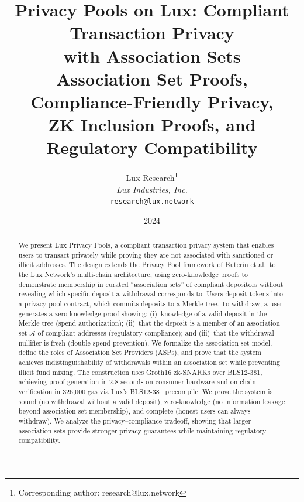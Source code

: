 \documentclass[11pt,a4paper]{article}
\title{\textbf{Privacy Pools on Lux: Compliant Transaction Privacy\\with Association Sets}\\[6pt]
\large Association Set Proofs, Compliance-Friendly Privacy,\\ZK Inclusion Proofs, and Regulatory Compatibility}
\author{
Lux Research\thanks{Corresponding author: research@lux.network}\\
\textit{Lux Industries, Inc.}\\
\texttt{research@lux.network}
}
\date{2024}
\begin{document}
\luxcoverpage

\begin{abstract}
We present Lux Privacy Pools, a compliant transaction privacy system that enables users to transact privately while proving they are not associated with sanctioned or illicit addresses. The design extends the Privacy Pool framework of Buterin et al.\ to the Lux Network's multi-chain architecture, using zero-knowledge proofs to demonstrate membership in curated ``association sets'' of compliant depositors without revealing which specific deposit a withdrawal corresponds to. Users deposit tokens into a privacy pool contract, which commits deposits to a Merkle tree. To withdraw, a user generates a zero-knowledge proof showing: (i)~knowledge of a valid deposit in the Merkle tree (spend authorization); (ii)~that the deposit is a member of an association set $\mathcal{A}$ of compliant addresses (regulatory compliance); and (iii)~that the withdrawal nullifier is fresh (double-spend prevention). We formalize the association set model, define the roles of Association Set Providers (ASPs), and prove that the system achieves indistinguishability of withdrawals within an association set while preventing illicit fund mixing. The construction uses Groth16 zk-SNARKs over BLS12-381, achieving proof generation in 2.8 seconds on consumer hardware and on-chain verification in 326,000 gas via Lux's BLS12-381 precompile. We prove the system is sound (no withdrawal without a valid deposit), zero-knowledge (no information leakage beyond association set membership), and complete (honest users can always withdraw). We analyze the privacy--compliance tradeoff, showing that larger association sets provide stronger privacy guarantees while maintaining regulatory compatibility.
\end{abstract}















\end{document}
